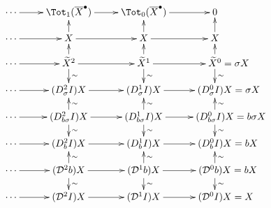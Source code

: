 \documentclass[10pt]{article}
\begin{document}
\begin{convergence}
\[\xymatrix@R=4mm{
\cdots 
\ar[r]
&%
\Tot_{1}(\overline{X}^\bullet)
\ar[r]
&%
\Tot_0(\overline{X}^\bullet)
\ar[r]&%
0
\\
\cdots
\ar[r]
&%
X
\ar[u]
\ar[r]
&%
X
\ar[u]
\ar[r]&%
X\ar[u]
\\
\cdots 
\ar[r]
&%
\widetilde{X}^2
\ar[u]_-{}
\ar[d]^-{\sim}
\ar[r]
&%
\widetilde{X}^1
\ar[u]_-{}
\ar[d]^-{\sim}
\ar[r]&%
\widetilde{X}^0\makebox[0pt][l]{$\mbox{}=\sigma X$}
\ar[u]_-{}
\ar[d]^-{\sim}\\
\cdots 
\ar[r]
&%
(\dupdown{2}{\sigma} I)X
\ar[r]
&%
(\dupdown{1}{\sigma} I)X
\ar[r]&%
(\dupdown{0}{\sigma} I)X\makebox[0pt][l]{$\mbox{}=\sigma X$}\\
\cdots 
\ar[r]
&%
(\dupdown{2}{b\sigma} I)X
\ar[u]_-{\sim}
\ar[d]^-{\sim}
\ar[r]
&%
(\dupdown{1}{b\sigma} I)X
\ar[u]_-{\sim}
\ar[d]^-{\sim}
\ar[r]&%
(\dupdown{0}{b\sigma} I)X\makebox[0pt][l]{$\mbox{}={b\sigma} X$}
\ar[u]_-{\sim}
\ar[d]^-{\sim}\\
\cdots 
\ar[r]
&%
(\dupdown{2}{b}I)X
\ar[r]
&%
(\dupdown{1}{b}I)X
\ar[r]&%
(\dupdown{0}{b}I)X\makebox[0pt][l]{$\mbox{}=bX$}\\
\cdots 
\ar[r]
&%
(\caldup{2}b)X
\ar[u]_-{\sim}
\ar[d]^-{\sim}
\ar[r]
&%
(\caldup{1}b)X
\ar[u]_-{\sim}
\ar[d]^-{\sim}
\ar[r]&%
(\caldup{0}b)X\makebox[0pt][l]{$\mbox{}=bX$}
\ar[u]_-{\sim}
\ar[d]^-{\sim}\\
\cdots 
\ar[r]
&%
(\caldup{2}I)X
\ar[r]
&%
(\caldup{1}I)X
\ar[r]&%
(\caldup{0}I)X\makebox[0pt][l]{$\mbox{}=X$}
}\]


\end{convergence}
\end{document}
